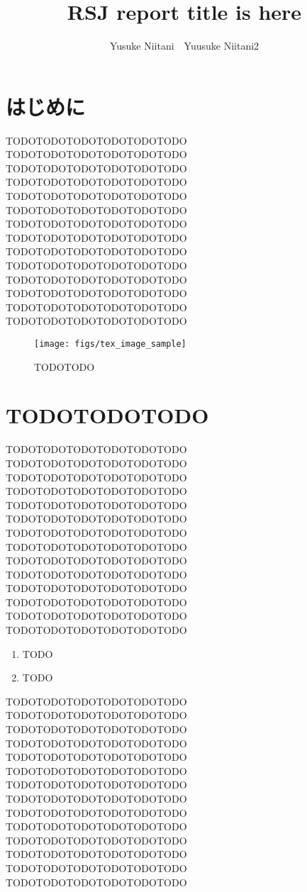 \documentclass{jarticle}
\begin{document}
\title{RSJ report title is here}
\author{Yusuke Niitani\ \ Yuusuke Niitani2}

\setlength{\baselineskip}{4.4mm}
\maketitle
\thispagestyle{empty}
\pagestyle{empty}

\section{はじめに}

TODOTODOTODOTODOTODOTODO TODOTODOTODOTODOTODOTODO\cite{Morgan:ROS}
TODOTODOTODOTODOTODOTODO TODOTODOTODOTODOTODOTODO
TODOTODOTODOTODOTODOTODO TODOTODOTODOTODOTODOTODO
TODOTODOTODOTODOTODOTODO TODOTODOTODOTODOTODOTODO
TODOTODOTODOTODOTODOTODO TODOTODOTODOTODOTODOTODO
TODOTODOTODOTODOTODOTODO TODOTODOTODOTODOTODOTODO
TODOTODOTODOTODOTODOTODO TODOTODOTODOTODOTODOTODO

\begin{figure}[b]
    \centering
    \texttt{[image: figs/tex\_image\_sample]}
    \vspace{6cm}
    \caption{TODOTODO}
    \label{fig:apc}
\end{figure}

\section{TODOTODOTODO}

TODOTODOTODOTODOTODOTODO TODOTODOTODOTODOTODOTODO
TODOTODOTODOTODOTODOTODO TODOTODOTODOTODOTODOTODO
TODOTODOTODOTODOTODOTODO TODOTODOTODOTODOTODOTODO
TODOTODOTODOTODOTODOTODO TODOTODOTODOTODOTODOTODO
TODOTODOTODOTODOTODOTODO TODOTODOTODOTODOTODOTODO
TODOTODOTODOTODOTODOTODO TODOTODOTODOTODOTODOTODO
TODOTODOTODOTODOTODOTODO TODOTODOTODOTODOTODOTODO

\begin{enumerate}
\item TODO
\item TODO
\end{enumerate}

TODOTODOTODOTODOTODOTODO TODOTODOTODOTODOTODOTODO
TODOTODOTODOTODOTODOTODO TODOTODOTODOTODOTODOTODO
TODOTODOTODOTODOTODOTODO TODOTODOTODOTODOTODOTODO
TODOTODOTODOTODOTODOTODO TODOTODOTODOTODOTODOTODO
TODOTODOTODOTODOTODOTODO TODOTODOTODOTODOTODOTODO
TODOTODOTODOTODOTODOTODO TODOTODOTODOTODOTODOTODO
TODOTODOTODOTODOTODOTODO TODOTODOTODOTODOTODOTODO
\end{document}
